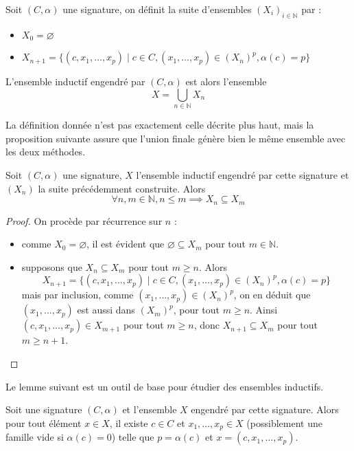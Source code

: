 \begin{definition}
  Soit $(C,\alpha)$ une signature, on définit la suite d'ensembles
  $(X_i)_{i\in\mathbb N}$ par :
  \begin{itemize}
  \item $X_0 = \varnothing$
  \item $X_{n+1} = \{ (c,x_1,\ldots,x_p) \mid c\in C, (x_1,\ldots,x_p)\in (X_n)^p,
    \alpha(c) = p \}$
  \end{itemize}

  L'ensemble inductif engendré par $(C,\alpha)$ est alors l'ensemble
  $$X = \bigcup_{n\in \mathbb N} X_n$$
\end{definition}

La définition donnée n'est pas exactement celle décrite plus haut, mais la
proposition suivante assure que l'union finale génère bien le même ensemble
avec les deux méthodes.

\begin{proposition}
  Soit $(C,\alpha)$ une signature, $X$ l'ensemble inductif engendré par cette
  signature et $(X_n)$ la suite précédemment construite. Alors
  $$\forall n,m \in \mathbb N, n \leq m \implies X_n \subseteq X_m$$
\end{proposition}

\begin{proof}
  On procède par récurrence sur $n$ :
  \begin{itemize}
  \item comme $X_0 = \varnothing$, il est évident que
    $\varnothing \subseteq X_m$ pour tout $m \in\mathbb N$.
  \item supposons que $X_n \subseteq X_m$ pour tout $m \geq n$. Alors
    $$X_{n+1} = \{(c,x_1,\ldots,x_p)\mid c\in C, (x_1,\ldots,x_p)\in(X_n)^p,
    \alpha(c) = p\}$$
    mais par inclusion, comme $(x_1,\ldots,x_p)\in (X_n)^p$, on en déduit que
    $(x_1,\ldots,x_p)$ est aussi dans $(X_m)^p$, pour tout $m \geq n$. Ainsi
    $(c,x_1,\ldots,x_p) \in X_{m+1}$ pour tout $m \geq n$, donc
    $X_{n+1}\subseteq X_m$ pour tout $m \geq n+1$.
  \end{itemize}
\end{proof}

Le lemme suivant est un outil de base pour étudier des ensembles inductifs.

\begin{lemma}
  Soit une signature $(C,\alpha)$ et l'ensemble $X$ engendré par cette
  signature. Alors pour tout élément $x \in X$, il existe $c\in C$ et
  $x_1,\ldots,x_p \in X$ (possiblement une famille vide si $\alpha(c) = 0$)
  telle que $p = \alpha(c)$ et $x = (c,x_1,\ldots,x_p)$.
\end{lemma}

